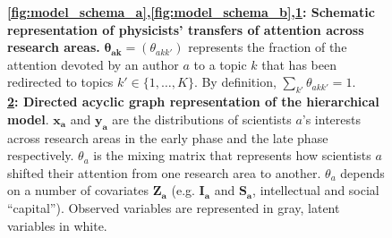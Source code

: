 \documentclass{article}
\begin{document}
\begin{figure}[h]
\begin{subfigure}[b]{0.25\textwidth}
{
          }  
          \caption{\label{fig:model_schema_c}}
     \end{subfigure}\hfill%
\begin{subfigure}[b]{0.22\textwidth}
    \centering
    \caption{\label{fig:model_structure}}
\end{subfigure}

     \caption{\textbf{\ref{fig:model_schema_a},\ref{fig:model_schema_b},\ref{fig:model_schema_c}: Schematic representation of physicists' transfers of attention across research areas.} $\bm{\theta_{ak}}=(\theta_{akk'})$ represents the fraction of the attention devoted by an author $a$ to a topic $k$ that has been redirected to topics $k' \in \{1,\dots,K\}$. By definition, $\sum_{k'} \theta_{akk'}=1$. %
     \\
     \textbf{\ref{fig:model_structure}: Directed acyclic graph representation of the hierarchical model}. $\bm{x_a}$ and $\bm{y_a}$ are the distributions of scientists $a$'s interests across research areas in the early phase and the late phase respectively. $\theta_a$ is the mixing matrix that represents how scientists $a$ shifted their attention from one research area to another. $\theta_a$ depends on a number of covariates $\bm{Z_a}$ (e.g. $\bm{I_a}$ and $\bm{S_a}$, intellectual and social ``capital''). Observed variables are represented in gray, latent variables in white.}
     \label{fig:ei}
 \end{figure}
\end{document}

